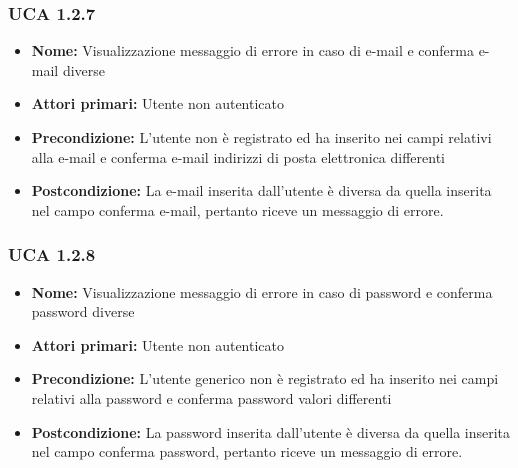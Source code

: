 \documentclass[a4paper, oneside, dvipsnames, table]{article} %
\begin{document}
\subsubsection{UCA 1.2.7}%
\begin{itemize}
\item \textbf{Nome:} Visualizzazione messaggio di errore in caso di e-mail e conferma e-mail diverse
\item \textbf{Attori primari:} Utente non autenticato
\item \textbf{Precondizione:} L’utente non è registrato ed ha inserito nei campi relativi alla e-mail e conferma e-mail indirizzi di posta elettronica differenti 
\item \textbf{Postcondizione:} La e-mail inserita dall'utente è diversa da quella inserita nel campo conferma e-mail, pertanto riceve un messaggio di errore.
\end{itemize}

\subsubsection{UCA 1.2.8}%
\begin{itemize}
\item \textbf{Nome:}  Visualizzazione messaggio di errore in caso di password e conferma password diverse
\item \textbf{Attori primari:} Utente non autenticato
\item \textbf{Precondizione:} L’utente generico non è registrato ed ha inserito nei campi relativi alla password e conferma password valori differenti
\item \textbf{Postcondizione:} La password inserita dall’utente è diversa da quella inserita nel campo conferma password, pertanto riceve un messaggio di errore.
\end{itemize}
\end{document}
